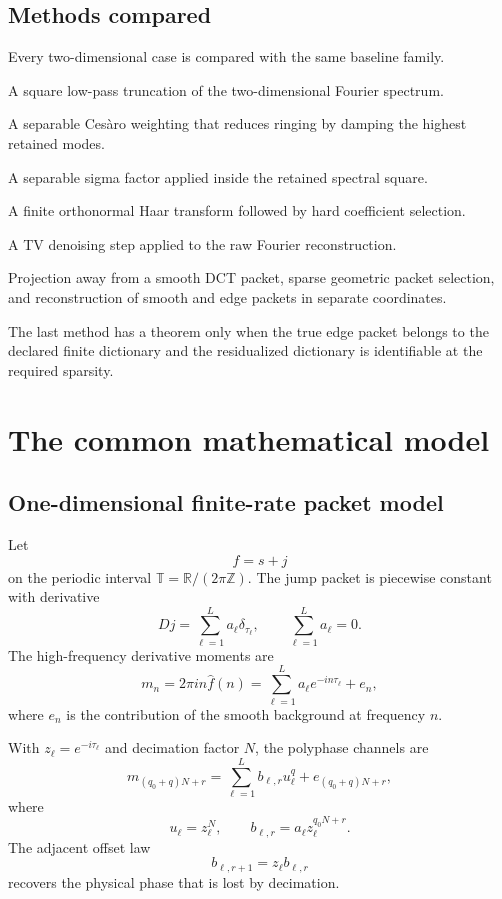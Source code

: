 \documentclass[11pt,oneside,openany]{book}
\theoremstyle{definition}
\theoremstyle{remark}
\newcommand{\R}{\mathbb R}
\newcommand{\T}{\mathbb T}
\begin{document}
\section{Methods compared}

Every two-dimensional case is compared with the same baseline family.

\begin{description}[leftmargin=1.6in,style=nextline]
\item[Raw Fourier] A square low-pass truncation of the two-dimensional Fourier spectrum.
\item[Fej\'er] A separable Ces\`aro weighting that reduces ringing by damping the highest retained modes.
\item[Lanczos] A separable sigma factor applied inside the retained spectral square.
\item[Haar threshold] A finite orthonormal Haar transform followed by hard coefficient selection.
\item[Total variation] A TV denoising step applied to the raw Fourier reconstruction.
\item[Dictionary resolved] Projection away from a smooth DCT packet, sparse geometric packet selection, and reconstruction of smooth and edge packets in separate coordinates.
\end{description}

The last method has a theorem only when the true edge packet belongs to the declared finite dictionary and the residualized dictionary is identifiable at the required sparsity.

\chapter{The common mathematical model}

\section{One-dimensional finite-rate packet model}

Let
\[
f=s+j
\]
on the periodic interval $\T=\R/(2\pi\mathbb Z)$. The jump packet is piecewise constant with derivative
\[
Dj=\sum_{\ell=1}^{L}a_\ell\delta_{\tau_\ell},
\qquad
\sum_{\ell=1}^{L}a_\ell=0.
\]
The high-frequency derivative moments are
\[
m_n=2\pi i n\widehat f(n)
=\sum_{\ell=1}^{L}a_\ell e^{-in\tau_\ell}+e_n,
\]
where $e_n$ is the contribution of the smooth background at frequency $n$.

With $z_\ell=e^{-i\tau_\ell}$ and decimation factor $N$, the polyphase channels are
\[
m_{(q_0+q)N+r}
=
\sum_{\ell=1}^{L}b_{\ell,r}u_\ell^q+e_{(q_0+q)N+r},
\]
where
\[
u_\ell=z_\ell^N,
\qquad
b_{\ell,r}=a_\ell z_\ell^{q_0N+r}.
\]
The adjacent offset law
\[
b_{\ell,r+1}=z_\ell b_{\ell,r}
\]
recovers the physical phase that is lost by decimation.
\end{document}
